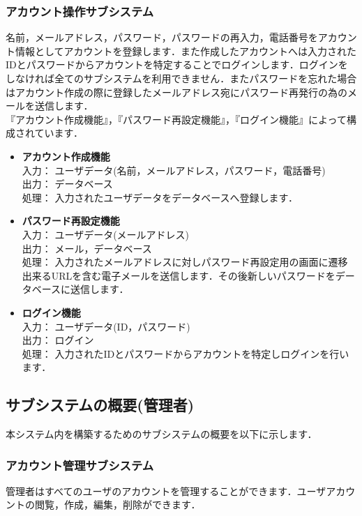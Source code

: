 \documentclass[a4j,titlepage]{jarticle}
\begin{document}
\subsubsection{アカウント操作サブシステム}
名前，メールアドレス，パスワード，パスワードの再入力，電話番号をアカウント情報としてアカウントを登録します．また作成したアカウントへは入力されたIDとパスワードからアカウントを特定することでログインします．ログインをしなければ全てのサブシステムを利用できません．またパスワードを忘れた場合はアカウント作成の際に登録したメールアドレス宛にパスワード再発行の為のメールを送信します． \\
『アカウント作成機能』，『パスワード再設定機能』，『ログイン機能』によって構成されています．

\begin{itemize}
\item \textbf{アカウント作成機能} \\
入力： ユーザデータ(名前，メールアドレス，パスワード，電話番号) \\
出力： データベース \\
処理： 入力されたユーザデータをデータベースへ登録します．
\item \textbf{パスワード再設定機能} \\
入力： ユーザデータ(メールアドレス) \\
出力： メール，データベース \\
処理： 入力されたメールアドレスに対しパスワード再設定用の画面に遷移出来るURLを含む電子メールを送信します．その後新しいパスワードをデータベースに送信します．
\item \textbf{ログイン機能} \\
入力： ユーザデータ(ID，パスワード) \\
出力： ログイン \\
処理： 入力されたIDとパスワードからアカウントを特定しログインを行います．
\end{itemize}

\subsection{サブシステムの概要(管理者)}
本システム内を構築するためのサブシステムの概要を以下に示します．

\subsubsection{アカウント管理サブシステム}
管理者はすべてのユーザのアカウントを管理することができます．ユーザアカウントの閲覧，作成，編集，削除ができます．
\end{document}
